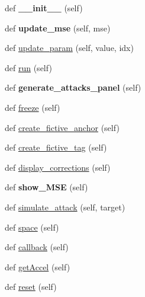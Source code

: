 \begin{DoxyCompactItemize}
\item 
\mbox{\label{class_menu_1_1_menu_ae64f0875afe3067b97ba370b354b9213}} 
def {\bfseries \+\_\+\+\_\+init\+\_\+\+\_\+} (self)
\item 
\mbox{\label{class_menu_1_1_menu_a0b799a782ab40afc9aaa24bdab882113}} 
def {\bfseries update\+\_\+mse} (self, mse)
\item 
def \mbox{\hyperlink{class_menu_1_1_menu_ac7d46e7da5b790d5efa729c03debbaf1}{update\+\_\+param}} (self, value, idx)
\item 
def \mbox{\hyperlink{class_menu_1_1_menu_ad22709b2e67308af35f55680d5a026e0}{run}} (self)
\item 
\mbox{\label{class_menu_1_1_menu_adb7ed53932939535e6f6343644e6731a}} 
def {\bfseries generate\+\_\+attacks\+\_\+panel} (self)
\item 
def \mbox{\hyperlink{class_menu_1_1_menu_a27ecebb6378a0b8dd1580f5fd1ba5c76}{freeze}} (self)
\item 
def \mbox{\hyperlink{class_menu_1_1_menu_a6a933e1b66dd2707e798efa5dbe724a7}{create\+\_\+fictive\+\_\+anchor}} (self)
\item 
def \mbox{\hyperlink{class_menu_1_1_menu_a47a07cce1b4c80a7d3c0a41045015f69}{create\+\_\+fictive\+\_\+tag}} (self)
\item 
def \mbox{\hyperlink{class_menu_1_1_menu_a32babc5b86a4f39290d2d4a10ef0ec5c}{display\+\_\+corrections}} (self)
\item 
\mbox{\label{class_menu_1_1_menu_abd427cc12572cc5e157ab2ef25d1faf0}} 
def {\bfseries show\+\_\+\+M\+SE} (self)
\item 
def \mbox{\hyperlink{class_menu_1_1_menu_a11923ed3ba9281c75035cbebc022fbf2}{simulate\+\_\+attack}} (self, target)
\item 
def \mbox{\hyperlink{class_menu_1_1_menu_a116637ec8c851d32fde26d0155337cbe}{space}} (self)
\item 
def \mbox{\hyperlink{class_menu_1_1_menu_ae075907d13c81100442befb9dd9c63c1}{callback}} (self)
\item 
def \mbox{\hyperlink{class_menu_1_1_menu_aabea3c091001d3cfad62483ffa367db8}{get\+Accel}} (self)
\item 
def \mbox{\hyperlink{class_menu_1_1_menu_a51829b63adb24ac48d350dee60181002}{reset}} (self)
\end{DoxyCompactItemize}
